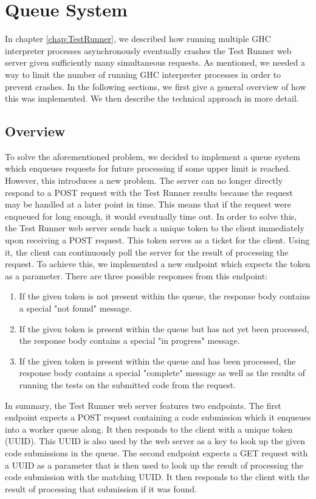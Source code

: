 \chapter{Queue System} \label{chap:QueueSystem}
In chapter \ref{chap:TestRunner}, we described how running multiple GHC interpreter processes asynchronously eventually crashes the Test Runner web server given sufficiently many simultaneous requests.
As mentioned, we needed a way to limit the number of running GHC interpreter processes in order to prevent crashes.
In the following sections, we first give a general overview of how this was implemented.
We then describe the technical approach in more detail.

\section{Overview}
To solve the aforementioned problem, we decided to implement a queue system which enqueues requests for future processing if some upper limit is reached.
However, this introduces a new problem.
The server can no longer directly respond to a POST request with the Test Runner results because the request may be handled at a later point in time.
This means that if the request were enqueued for long enough, it would eventually time out.
In order to solve this, the Test Runner web server sends back a unique token to the client immediately upon receiving a POST request.
This token serves as a ticket for the client.
Using it, the client can continuously poll the server for the result of processing the request.
To achieve this, we implemented a new endpoint which expects the token as a parameter.
There are three possible responses from this endpoint:
\begin{enumerate}
    \item If the given token is not present within the queue, the response body contains a special "not found" message.
    \item If the given token is present within the queue but has not yet been processed, the response body contains a special "in progress" message.
    \item If the given token is present within the queue and has been processed, the response body contains a special "complete" message as well as the results of running the tests on the submitted code from the request.
\end{enumerate}

In summary, the Test Runner web server features two endpoints.
The first endpoint expects a POST request containing a code submission which it enqueues into a worker queue along.
It then responds to the client with a unique token (UUID).
This UUID is also used by the web server as a key to look up the given code submissions in the queue.
The second endpoint expects a GET request with a UUID as a parameter that is then used to look up the result of processing the code submission with the matching UUID.
It then responds to the client with the result of processing that submission if it was found.


